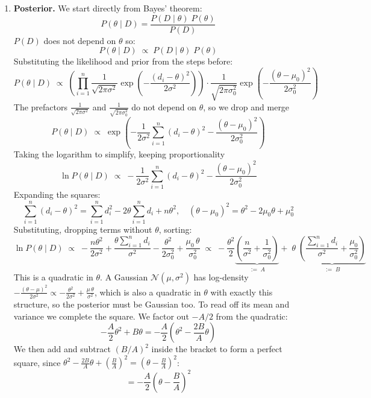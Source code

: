 \documentclass[12pt, a4paper]{article}
\begin{document}
\begin{enumerate}
\item \textbf{Posterior.} We start directly from Bayes' theorem:
\[
    P(\theta \mid D) = \frac{P(D \mid \theta)\; P(\theta)}{P(D)}
\]
$P(D)$ does not depend on $\theta$ so:
\[
    P(\theta \mid D) \;\propto\; P(D \mid \theta)\; P(\theta)
\]
Substituting the likelihood and prior from the steps before:
\[
    P(\theta \mid D)
    \;\propto\;
    \left(
      \prod_{i=1}^{n}
      \frac{1}{\sqrt{2\pi\sigma^2}}
      \exp\!\left(-\frac{(d_i-\theta)^2}{2\sigma^2}\right)
    \right)
    \cdot
    \frac{1}{\sqrt{2\pi\sigma_0^2}}
    \exp\!\left(-\frac{(\theta-\mu_0)^2}{2\sigma_0^2}\right)
\]
The prefactors $\frac{1}{\sqrt{2\pi\sigma^2}}$ and
$\frac{1}{\sqrt{2\pi\sigma_0^2}}$ do not depend on $\theta$, so we drop and merge
\[
    P(\theta \mid D)
    \;\propto\;
    \exp\!\left(
        -\frac{1}{2\sigma^2}\sum_{i=1}^{n}(d_i - \theta)^2
        -\frac{(\theta - \mu_0)^2}{2\sigma_0^2}
    \right)
\]
Taking the logarithm to simplify, keeping proportionality
\[
    \ln P(\theta \mid D)
    \;\propto\;
    -\frac{1}{2\sigma^2}\sum_{i=1}^{n}(d_i - \theta)^2
    -\frac{(\theta - \mu_0)^2}{2\sigma_0^2}
\]
Expanding the squares:
\[
    \sum_{i=1}^{n}(d_i - \theta)^2
    = \sum_{i=1}^{n} d_i^2 - 2\theta\sum_{i=1}^{n} d_i + n\theta^2, \quad
    (\theta - \mu_0)^2 = \theta^2 - 2\mu_0\theta + \mu_0^2
\]
Substituting, dropping terms without $\theta$, sorting:
\[
    \ln P(\theta \mid D)
    \;\propto\;
    -\frac{n\theta^2}{2\sigma^2}
    +\frac{\theta \sum_{i=1}^{n} d_i}{\sigma^2}
    -\frac{\theta^2}{2\sigma_0^2}
    +\frac{\mu_0\,\theta}{\sigma_0^2}
    \;\propto\;
    -\frac{\theta^2}{2}
     \underbrace{\left(\frac{n}{\sigma^2} + \frac{1}{\sigma_0^2}\right)}_{:=\; A}
    +\;\theta\;
     \underbrace{\left(\frac{\sum_{i=1}^n d_i}{\sigma^2}
                      + \frac{\mu_0}{\sigma_0^2}\right)}_{:=\; B}
\]
This is a quadratic in $\theta$. A Gaussian
$\mathcal{N}(\mu, \sigma^2)$ has log-density
$-\frac{(\theta-\mu)^2}{2\sigma^2} \propto -\frac{\theta^2}{2\sigma^2}
+ \frac{\mu\,\theta}{\sigma^2}$,
which is also a quadratic in $\theta$ with exactly this structure,
so the posterior must be Gaussian too. To read off its mean and variance we complete the square.
We factor out $-A/2$ from the quadratic:
\[
    -\frac{A}{2}\theta^2 + B\theta
    = -\frac{A}{2}
      \!\left(\theta^2 - \frac{2B}{A}\theta\right)
\]
We then add and subtract $\left(B/A\right)^2$ inside the bracket
to form a perfect square, since
$\theta^2 - \frac{2B}{A}\theta + \left(\frac{B}{A}\right)^2
= \left(\theta - \frac{B}{A}\right)^2$:
\[
    = -\frac{A}{2}
      \!\left(\theta - \frac{B}{A}\right)^{\!2}
\]
\end{enumerate}
\end{document}
